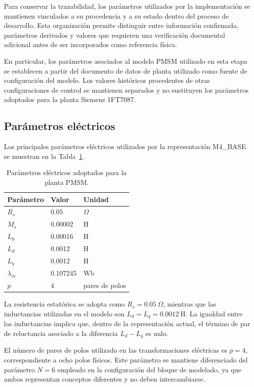 Para conservar la trazabilidad, los parámetros utilizados por la implementación se mantienen vinculados a su procedencia y a su estado dentro del proceso de desarrollo. Esta organización permite distinguir entre información confirmada, parámetros derivados y valores que requieren una verificación documental adicional antes de ser incorporados como referencia física.

En particular, los parámetros asociados al modelo PMSM utilizado en esta etapa se establecen a partir del documento de datos de planta utilizado como fuente de configuración del modelo. Los valores históricos procedentes de otras configuraciones de control se mantienen separados y no sustituyen los parámetros adoptados para la planta Siemens 1FT7087.

\subsection{Parámetros eléctricos}

Los principales parámetros eléctricos utilizados por la representación M4\_BASE se muestran en la Tabla~\ref{tab:parametros-electricos-m4}.

\begin{table}[H]
\centering
\caption{Parámetros eléctricos adoptados para la planta PMSM.}
\label{tab:parametros-electricos-m4}
\begin{tabular}{lll}
\toprule
Parámetro & Valor & Unidad \\
\midrule
$R_s$ & 0.05 & $\Omega$ \\
$M_s$ & 0.00002 & H \\
$L_0$ & 0.00016 & H \\
$L_d$ & 0.0012 & H \\
$L_q$ & 0.0012 & H \\
$\lambda_m$ & 0.107245 & Wb \\
$p$ & 4 & pares de polos \\
\bottomrule
\end{tabular}
\end{table}

La resistencia estatórica se adopta como $R_s=0.05~\Omega$, mientras que las inductancias utilizadas en el modelo son $L_d=L_q=0.0012~\mathrm{H}$. La igualdad entre las inductancias implica que, dentro de la representación actual, el término de par de reluctancia asociado a la diferencia $L_d-L_q$ es nulo.

El número de pares de polos utilizado en las transformaciones eléctricas es $p=4$, correspondiente a ocho polos físicos. Este parámetro se mantiene diferenciado del parámetro $N=6$ empleado en la configuración del bloque de modelado, ya que ambos representan conceptos diferentes y no deben intercambiarse.


